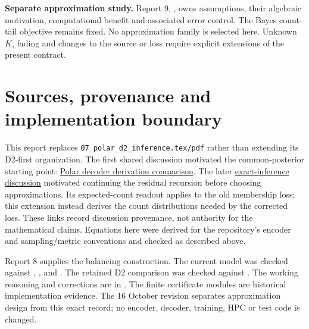 \documentclass[10pt,a4paper]{article}
\begin{document}
\textbf{Separate approximation study.} Report 9, , owns
assumptions, their algebraic motivation, computational benefit and associated error control. The Bayes
count-tail objective remains fixed. No approximation family is selected here. Unknown $K$, fading and
changes to the source or loss require explicit extensions of the present contract.

\clearpage
\section*{Sources, provenance and implementation boundary}
This report replaces \texttt{07\_polar\_d2\_inference.tex/pdf} rather than extending its D2-first organization.
The first shared discussion motivated the common-posterior starting point:
\href{https://chatgpt.com/share/6acb8c8b-7708-83eb-a1de-175361ec21a9}{Polar decoder derivation comparison}.
The later \href{https://chatgpt.com/share/6acc145d-52dc-83eb-bc9e-bd31e185960c}{exact-inference discussion}
motivated continuing the residual recursion before choosing approximations. Its expected-count readout applies to
the old membership loss; this extension instead derives the count distributions needed by the corrected loss.
These links record discussion provenance, not authority for the mathematical claims. Equations here were derived for the
repository's encoder and sampling/metric conventions and checked as described above.

Report 8 supplies the balancing construction. The current model was checked against
, ,
 and .
The retained D2 comparison was checked against .
The working reasoning and corrections are in .
The finite certificate modules are historical implementation evidence. The 16 October revision separates
approximation design from this exact record; no encoder, decoder, training, HPC or test code is changed.
\end{document}
